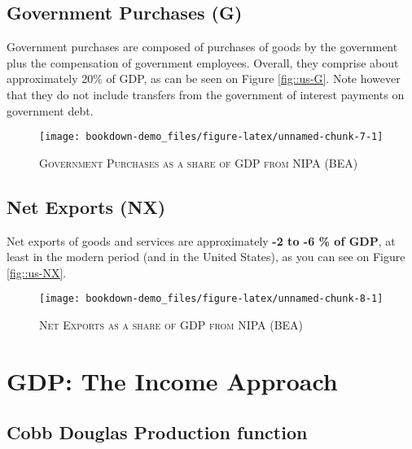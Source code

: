\documentclass[]{book}
\theoremstyle{definition}
\theoremstyle{definition}
\theoremstyle{definition}
\theoremstyle{remark}
\begin{document}
\hypertarget{gov}{\subsection{Government Purchases (G)}\label{gov}}

Government purchases are composed of purchases of goods by the
government plus the compensation of government employees. Overall, they
comprise about approximately 20\% of GDP, as can be seen on Figure
\ref{fig::us-G}. Note however that they do not include transfers from
the government of interest payments on government debt.

\begin{figure}

{\centering \texttt{[image: bookdown-demo\_files/figure-latex/unnamed-chunk-7-1]} 

}

\caption{\label{fig::us-G}\textsc{Government Purchases as a share of GDP from NIPA (BEA)}}\label{fig:unnamed-chunk-7}
\end{figure}

\hypertarget{net-exports}{\subsection{Net Exports
(NX)}\label{net-exports}}

Net exports of goods and services are approximately \textbf{-2 to -6 \%
of GDP}, at least in the modern period (and in the United States), as
you can see on Figure \ref{fig::us-NX}.

\begin{figure}

{\centering \texttt{[image: bookdown-demo\_files/figure-latex/unnamed-chunk-8-1]} 

}

\caption{\label{fig::us-NX}\textsc{Net Exports as a share of GDP from NIPA (BEA)}}\label{fig:unnamed-chunk-8}
\end{figure}

\hypertarget{gdp-income}{\section{GDP: The Income
Approach}\label{gdp-income}}

\subsection{Cobb Douglas Production
function}\label{cobb-douglas-production-function}
\end{document}
